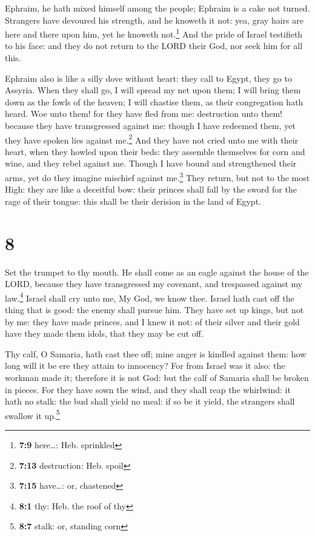  Ephraim, he hath mixed himself among the people; Ephraim
is a cake not turned.  Strangers have devoured his
strength, and he knoweth it not: yea, gray hairs are here and there upon
him, yet he knoweth not.\footnote{\textbf{7:9} here\ldots: Heb.
  sprinkled}  And the pride of Israel testifieth to his
face: and they do not return to the LORD their God, nor seek him for all
this.

 Ephraim also is like a silly dove without heart: they
call to Egypt, they go to Assyria.  When they shall go, I
will spread my net upon them; I will bring them down as the fowls of the
heaven; I will chastise them, as their congregation hath heard.
 Woe unto them! for they have fled from me: destruction
unto them! because they have transgressed against me: though I have
redeemed them, yet they have spoken lies against me.\footnote{\textbf{7:13}
  destruction: Heb. spoil}  And they have not cried unto
me with their heart, when they howled upon their beds: they assemble
themselves for corn and wine, and they rebel against me. 
Though I have bound and strengthened their arms, yet do they imagine
mischief against me.\footnote{\textbf{7:15} have\ldots: or, chastened}
 They return, but not to the most High: they are like a
deceitful bow: their princes shall fall by the sword for the rage of
their tongue: this shall be their derision in the land of Egypt.

\hypertarget{section-7}{%
\section{8}\label{section-7}}

 Set the trumpet to thy mouth. He shall come as an eagle
against the house of the LORD, because they have transgressed my
covenant, and trespassed against my law.\footnote{\textbf{8:1} thy: Heb.
  the roof of thy}  Israel shall cry unto me, My God, we
know thee.  Israel hath cast off the thing that is good:
the enemy shall pursue him.  They have set up kings, but
not by me: they have made princes, and I knew it not: of their silver
and their gold have they made them idols, that they may be cut off.

 Thy calf, O Samaria, hath cast thee off; mine anger is
kindled against them: how long will it be ere they attain to innocency?
 For from Israel was it also: the workman made it;
therefore it is not God: but the calf of Samaria shall be broken in
pieces.  For they have sown the wind, and they shall reap
the whirlwind: it hath no stalk: the bud shall yield no meal: if so be
it yield, the strangers shall swallow it up.\footnote{\textbf{8:7}
  stalk: or, standing corn}

